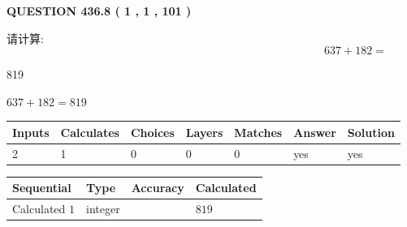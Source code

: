 \documentclass{ctexart}
\begin{document}
   
  
\vspace{0.2in}
  
{\textbf{\Large{QUESTION
436.8 
 ( 1 , 1 , 101 )
}}}
  
  
 
请计算:
\begin{equation}
637 +  %
182 = \nonumber
\end{equation}
 
 
 
\noindent{}
 
 

819
 
 
\noindent{}
 
 

 
 
 
\noindent{}
 
 

$ %
637 +  %
182=   %
819$
 
 
\noindent{}
 
 

 
   
   
   
   
\noindent\begin{tabular}{|l|l|l|l|l|l|l|}
 \hline
Inputs & Calculates & Choices & Layers & Matches & Answer & Solution \\ \hline
 2  & 
 1  & 
 0
  & 
 0  & 
 0  & 
  yes & 
  yes 
  \\ \hline
 \end{tabular}
   
   
   
   
\noindent{}
   
   
  
  
\noindent\begin{tabular}{|l|l|l|l|}
\hline
 Sequential & Type & Accuracy & Calculated \\ 
\hline
 
 
  Calculated $  1 $ & integer &  & 
  $ 819 $ 
 \\  \hline  
 \end{tabular}
   
\end{document}
